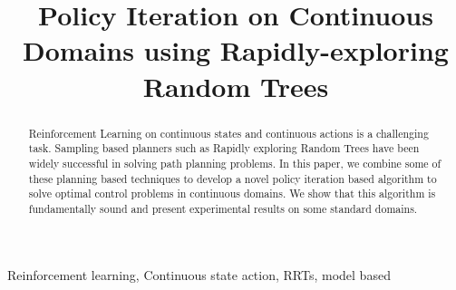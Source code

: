 \documentclass[wcp]{jmlr}
\title[RRTPI]{Policy Iteration on Continuous Domains using Rapidly-exploring Random Trees}
\begin{document}
\maketitle

\begin{abstract}
Reinforcement Learning on continuous states and continuous actions is a challenging task. Sampling based planners such as Rapidly exploring Random Trees have been widely successful in solving path planning problems. In this paper, we combine some of these planning based techniques to develop a novel policy iteration based algorithm to solve optimal control problems in continuous domains. We show that this algorithm is fundamentally sound and present experimental results on some standard domains.
\end{abstract}
\begin{keywords}
Reinforcement learning, Continuous state action, RRTs, model based
\end{keywords}
\end{document}
